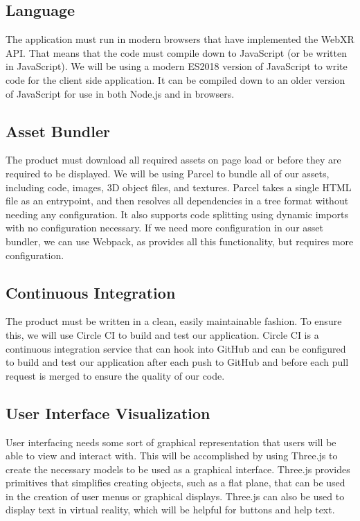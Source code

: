 \documentclass[onecolumn, draftclsnofoot,10pt, compsoc]{IEEEtran}
\begin{document}
\subsection{Language}
The application must run in modern browsers that have implemented the WebXR API. That means that the code must compile down to JavaScript (or be written in JavaScript). We will be using a modern ES2018 version of JavaScript to write code for the client side application. It can be compiled down to an older version of JavaScript for use in both Node.js and in browsers.

\subsection{Asset Bundler}
The product must download all required assets on page load or before they are required to be displayed. We will be using Parcel to bundle all of our assets, including code, images, 3D object files, and textures. Parcel takes a single HTML file as an entrypoint, and then resolves all dependencies in a tree format without needing any configuration. It also supports code splitting using dynamic imports with no configuration necessary. If we need more configuration in our asset bundler, we can use Webpack, as provides all this functionality, but requires more configuration. 

\subsection{Continuous Integration}
The product must be written in a clean, easily maintainable fashion. To ensure this, we will use Circle CI to build and test our application. Circle CI is a continuous integration service that can hook into GitHub and can be configured to build and test our application after each push to GitHub and before each pull request is merged to ensure the quality of our code. 

\subsection{User Interface Visualization}
User interfacing needs some sort of graphical representation that users will be able to view and interact with. This will be accomplished by using Three.js to create the necessary models to be used as a graphical interface. Three.js provides primitives that simplifies creating objects, such as a flat plane, that can be used in the creation of user menus or graphical displays. Three.js can also be used to display text in virtual reality, which will be helpful for buttons and help text.
\end{document}
